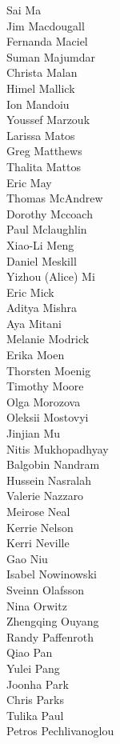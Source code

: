 Sai Ma\\
Jim Macdougall\\
Fernanda Maciel\\
Suman Majumdar\\
Christa Malan\\
Himel Mallick\\
Ion Mandoiu\\
Youssef Marzouk\\
Larissa Matos\\
Greg Matthews\\
Thalita Mattos\\
Eric May\\
Thomas McAndrew\\
Dorothy Mccoach\\
Paul Mclaughlin\\
Xiao-Li Meng\\
Daniel Meskill\\
Yizhou (Alice) Mi\\
Eric Mick\\
Aditya Mishra\\
Aya Mitani\\
Melanie Modrick\\
Erika Moen\\
Thorsten Moenig\\
Timothy Moore\\
Olga Morozova\\
Oleksii Mostovyi\\
Jinjian Mu\\
Nitis Mukhopadhyay\\
Balgobin Nandram\\
Hussein Nasralah\\
Valerie Nazzaro\\
Meirose Neal\\
Kerrie Nelson\\
Kerri Neville\\
Gao Niu\\
Isabel Nowinowski\\
Sveinn Olafsson\\
Nina Orwitz\\
Zhengqing Ouyang\\
Randy Paffenroth\\
Qiao Pan\\
Yulei Pang\\
Joonha Park\\
Chris Parks\\
Tulika Paul\\
Petros Pechlivanoglou\\
